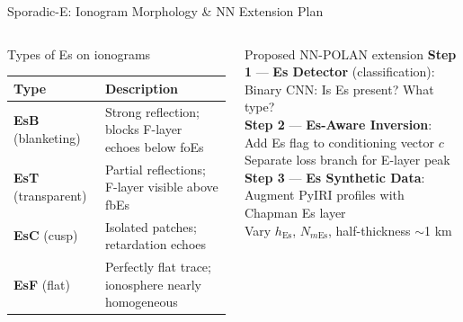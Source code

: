 \documentclass[aspectratio=169,10pt]{beamer}
\begin{document}
\begin{frame}{Sporadic-E: Ionogram Morphology \& NN Extension Plan}
\begin{columns}
\begin{block}{Types of Es on ionograms}
  \scriptsize
  \begin{tabular}{@{}lp{5cm}@{}}
  \toprule
  \textbf{Type} & \textbf{Description}\\
  \midrule
  \textbf{EsB} (blanketing) & Strong reflection; blocks F-layer echoes below foEs\\
  \textbf{EsT} (transparent) & Partial reflections; F-layer visible above fbEs\\
  \textbf{EsC} (cusp) & Isolated patches; retardation echoes\\
  \textbf{EsF} (flat) & Perfectly flat trace; ionosphere nearly homogeneous\\
  \bottomrule
  \end{tabular}
\end{block}
\vspace{4pt}
\begin{exampleblock}{Proposed NN-POLAN extension}
  \scriptsize
  \textbf{Step 1} — \textbf{Es Detector} (classification):\\
  \quad Binary CNN: Is Es present? What type?\\[3pt]
  \textbf{Step 2} — \textbf{Es-Aware Inversion}:\\
  \quad Add Es flag to conditioning vector $c$\\
  \quad Separate loss branch for E-layer peak\\[3pt]
  \textbf{Step 3} — \textbf{Es Synthetic Data}:\\
  \quad Augment PyIRI profiles with Chapman Es layer\\
  \quad Vary $h_\mathrm{Es}$, $N_{m\mathrm{Es}}$, half-thickness $\sim$1 km
\end{exampleblock}
\end{columns}
\end{frame}


\end{document}
